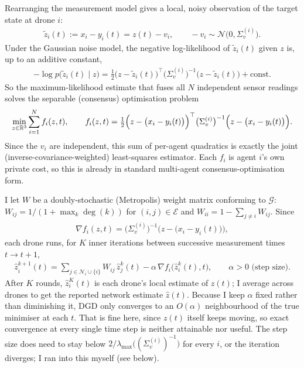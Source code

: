 \documentclass[a4paper, 11pt]{article}
\begin{document}
\begin{solution}
Rearranging the measurement model gives a local, noisy observation of the target state at drone $i$:
\begin{align*}
    \tilde z_i(t) := x_i-y_i(t) = z(t)-v_i, \qquad -v_i\sim\mathcal{N}\big(0,\Sigma_v^{(i)}\big).
\end{align*}
Under the Gaussian noise model, the negative log-likelihood of $\tilde z_i(t)$ given $z$ is, up to an additive constant,
\begin{align*}
    -\log p\big(\tilde z_i(t)\mid z\big) = \tfrac12\big(z-\tilde z_i(t)\big)^\top\big(\Sigma_v^{(i)}\big)^{-1}\big(z-\tilde z_i(t)\big)+\text{const.}
\end{align*}
So the maximum-likelihood estimate that fuses all $N$ independent sensor readings solves the separable (consensus) optimisation problem
\begin{align*}
    \min_{z\in\mathbb{R}^3}\sum_{i=1}^N f_i(z,t), \qquad f_i(z,t)=\tfrac12\Big(z-\big(x_i-y_i(t)\big)\Big)^\top\big(\Sigma_v^{(i)}\big)^{-1}\Big(z-\big(x_i-y_i(t)\big)\Big).
\end{align*}
Since the $v_i$ are independent, this sum of per-agent quadratics is exactly the joint (inverse-covariance-weighted) least-squares estimator. Each $f_i$ is agent $i$'s own private cost, so this is already in standard multi-agent consensus-optimisation form.

I let $W$ be a doubly-stochastic (Metropolis) weight matrix conforming to $\mathcal{G}$: $W_{ij}=1/(1+\max_k\deg(k))$ for $(i,j)\in\mathcal{E}$ and $W_{ii}=1-\sum_{j\ne i}W_{ij}$. Since
\begin{align*}
    \nabla f_i(z,t) = \big(\Sigma_v^{(i)}\big)^{-1}\Big(z-\big(x_i-y_i(t)\big)\Big),
\end{align*}
each drone runs, for $K$ inner iterations between successive measurement times $t\to t+1$,
\begin{align*}
    \hat z_i^{k+1}(t) = \sum_{j\in\mathcal{N}_i\cup\{i\}}W_{ij}\,\hat z_j^{k}(t) - \alpha\,\nabla f_i\big(\hat z_i^{k}(t),t\big), \qquad \alpha>0 \text{ (step size)}.
\end{align*}
After $K$ rounds, $\hat z_i^K(t)$ is each drone's local estimate of $z(t)$; I average across drones to get the reported network estimate $\hat z(t)$. Because I keep $\alpha$ fixed rather than diminishing it, DGD only converges to an $O(\alpha)$ neighbourhood of the true minimiser at each $t$. That is fine here, since $z(t)$ itself keeps moving, so exact convergence at every single time step is neither attainable nor useful. The step size does need to stay below $2/\lambda_{\max}\big((\Sigma_v^{(i)})^{-1}\big)$ for every $i$, or the iteration diverges; I ran into this myself (see below).


\end{solution}
\end{document}
